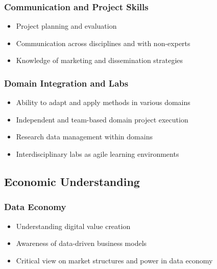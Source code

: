 \documentclass[
        english,biblatex
    ]{lni}
\providecommand{\tightlist}{%
    \setlength{\itemsep}{0pt}\setlength{\parskip}{0pt}}
\begin{document}
    \subsubsection{Communication and Project
    Skills}\label{communication-and-project-skills}

    \begin{itemize}
    \tightlist
    \item
      Project planning and evaluation
    \item
      Communication across disciplines and with non-experts
    \item
      Knowledge of marketing and dissemination strategies
    \end{itemize}

    \subsubsection{Domain Integration and
    Labs}\label{domain-integration-and-labs}

    \begin{itemize}
    \tightlist
    \item
      Ability to adapt and apply methods in various domains
    \item
      Independent and team-based domain project execution
    \item
      Research data management within domains
    \item
      Interdisciplinary labs as agile learning environments
    \end{itemize}

    \subsection{Economic Understanding}\label{economic-understanding}

    \subsubsection{Data Economy}\label{data-economy}

    \begin{itemize}
    \tightlist
    \item
      Understanding digital value creation
    \item
      Awareness of data-driven business models
    \item
      Critical view on market structures and power in data economy
    \end{itemize}
\end{document}
